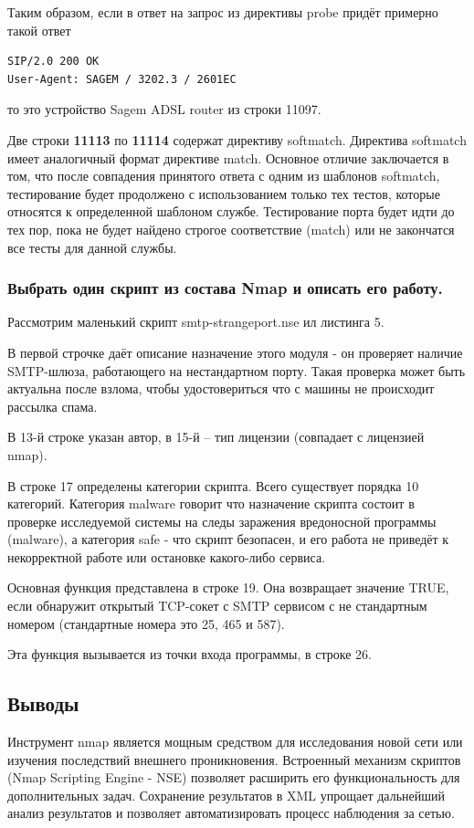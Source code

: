 Таким образом, если в ответ на запрос из директивы probe придёт примерно такой ответ
\begin{Verbatim}[frame=single]
SIP/2.0 200 OK
User-Agent: SAGEM / 3202.3 / 2601EC
\end{Verbatim}
то это устройство Sagem ADSL router из строки 11097.

Две строки \textbf{11113} по \textbf{11114} содержат директиву softmatch. Директива softmatch имеет аналогичный формат директиве match. Основное отличие заключается в том, что после совпадения принятого ответа с одним из шаблонов softmatch, тестирование будет продолжено с использованием только тех тестов, которые относятся к определенной шаблоном службе. Тестирование порта будет идти до тех пор, пока не будет найдено строгое соответствие (match) или не закончатся все тесты для данной службы.

\subsubsection{Выбрать один скрипт из состава Nmap и описать его работу.}

Рассмотрим маленький скрипт smtp-strangeport.nse ил листинга 5.



В первой строчке даёт описание назначение этого модуля - он проверяет наличие SMTP-шлюза, работающего на нестандартном порту. Такая проверка может быть актуальна после взлома, чтобы удостовериться что с машины не происходит рассылка спама.

В 13-й строке указан автор, в 15-й -- тип лицензии (совпадает с лицензией nmap).

В строке 17 определены категории скрипта. Всего существует порядка 10 категорий. Категория malware говорит что назначение скрипта состоит в проверке исследуемой системы на следы заражения вредоносной программы (malware), а категория safe - что скрипт безопасен, и его работа не приведёт к некорректной работе или остановке какого-либо сервиса.

Основная функция представлена в строке 19. Она возвращает значение TRUE, если обнаружит открытый TCP-сокет с SMTP сервисом с не стандартным номером (стандартные номера это 25, 465 и 587).

Эта функция вызывается из точки входа программы, в строке 26.

\subsection{Выводы}

Инструмент nmap является мощным средством для исследования новой сети или изучения последствий внешнего проникновения. Встроенный механизм скриптов (Nmap Scripting Engine - NSE) позволяет расширить его функциональность для дополнительных задач. Сохранение результатов в XML упрощает дальнейший анализ результатов и позволяет автоматизировать процесс наблюдения за сетью.

